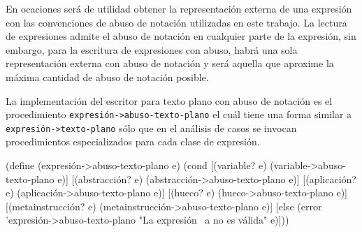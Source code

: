 En ocaciones será de utilidad obtener la representación externa de una expresión con las convenciones de abuso de notación utilizadas en este trabajo. La lectura de expresiones admite el abuso de notación en cualquier parte de la expresión, sin embargo, para la escritura de expresiones con abuso, habrá una sola representación externa con abuso de notación y será aquella que aproxime la máxima cantidad de abuso de notación posible.

La implementación del escritor para texto plano con abuso de notación es el procedimiento {\tt{}\protect{}expresión->abuso-texto-plano} el cuál tiene una forma similar a {\tt{}\protect{}expresión->texto-plano} sólo que en el análisis de casos se invocan procedimientos especializados para cada clase de expresión.

\nwenddocs{}\endmoddef
(define (expresión->abuso-texto-plano e)
  (cond
   [(variable? e)
    (variable->abuso-texto-plano e)]
   [(abstracción? e)
    (abstracción->abuso-texto-plano e)]
   [(aplicación? e)
    (aplicación->abuso-texto-plano e)]
   [(hueco? e)
    (hueco->abuso-texto-plano e)]
   [(metainstrucción? e)
    (metainstrucción->abuso-texto-plano e)]
   [else
    (error 'expresión->abuso-texto-plano
           "La expresión ~a no es válida" e)]))

